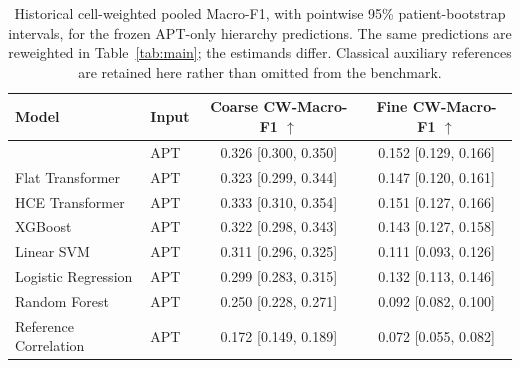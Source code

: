 \begin{table}[t]
\centering\small
\setlength{\tabcolsep}{6pt}
\begin{tabular}{llcc}
\toprule
Model & Input & Coarse CW-Macro-F1 $\uparrow$ & Fine CW-Macro-F1 $\uparrow$ \\
\midrule
\ourmethod{} & APT & 0.326 [0.300, 0.350] & 0.152 [0.129, 0.166] \\
Flat Transformer & APT & 0.323 [0.299, 0.344] & 0.147 [0.120, 0.161] \\
HCE Transformer & APT & 0.333 [0.310, 0.354] & 0.151 [0.127, 0.166] \\
XGBoost & APT & 0.322 [0.298, 0.343] & 0.143 [0.127, 0.158] \\
Linear SVM & APT & 0.311 [0.296, 0.325] & 0.111 [0.093, 0.126] \\
Logistic Regression & APT & 0.299 [0.283, 0.315] & 0.132 [0.113, 0.146] \\
Random Forest & APT & 0.250 [0.228, 0.271] & 0.092 [0.082, 0.100] \\
Reference Correlation & APT & 0.172 [0.149, 0.189] & 0.072 [0.055, 0.082] \\
\bottomrule
\end{tabular}
\caption{Historical cell-weighted pooled Macro-F1, with pointwise 95\% patient-bootstrap intervals, for the frozen APT-only hierarchy predictions. The same predictions are reweighted in Table~\ref{tab:main}; the estimands differ. Classical auxiliary references are retained here rather than omitted from the benchmark.}
\label{tab:hierarchy_cell_weighted}
\end{table}
